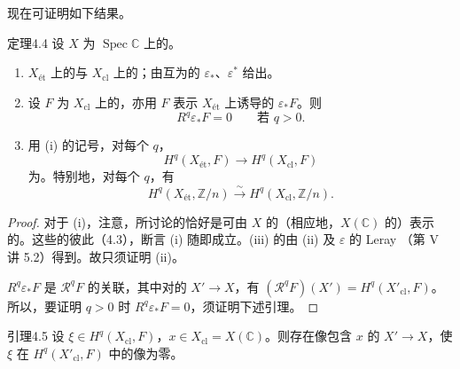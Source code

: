 现在可证明如下结果。
\begin{SGAresult}{定理}{4.4}
设 $X$ 为 $\operatorname{Spec}\mathbb C$ 上的。
\begin{enumerate}
\item[(i)] $X_{\text{ét}}$ 上的与 $X_{\mathrm{cl}}$ 上的；由互为的 $\varepsilon_*$、$\varepsilon^*$ 给出。
\item[(ii)] 设 $F$ 为 $X_{\mathrm{cl}}$ 上的，亦用 $F$ 表示 $X_{\text{ét}}$ 上诱导的 $\varepsilon_*F$。则
\[
 R^q\varepsilon_*F=0\qquad\text{若 }q>0.
\]
\item[(iii)] 用 (i) 的记号，对每个 $q$，
\[
 H^q(X_{\text{ét}},F)\longrightarrow H^q(X_{\mathrm{cl}},F)
\]
为。特别地，对每个 $q$，有
\[
 H^q(X_{\text{ét}},\mathbb Z/n)\xrightarrow{\sim}H^q(X_{\mathrm{cl}},\mathbb Z/n).
\]
\end{enumerate}
\end{SGAresult}
\begin{proof}
对于 (i)，注意，所讨论的恰好是可由 $X$ 的（相应地，$X(\mathbb C)$ 的）表示的。这些的彼此（4.3），断言 (i) 随即成立。(iii) 的由 (ii) 及 $\varepsilon$ 的 Leray （第 V 讲 5.2）得到。故只须证明 (ii)。

$R^q\varepsilon_*F$ 是 $\mathscr R^qF$ 的关联，其中对的 $X'\to X$，有 $(\mathscr R^qF)(X')=H^q(X'_{\mathrm{cl}},F)$。所以，要证明 $q>0$ 时 $R^q\varepsilon_*F=0$，须证明下述引理。
\end{proof}
\begin{SGAresult}{引理}{4.5}
设 $\xi\in H^q(X_{\mathrm{cl}},F)$，$x\in X_{\mathrm{cl}}=X(\mathbb C)$。则存在像包含 $x$ 的 $X'\to X$，使 $\xi$ 在 $H^q(X'_{\mathrm{cl}},F)$ 中的像为零。
\end{SGAresult}
